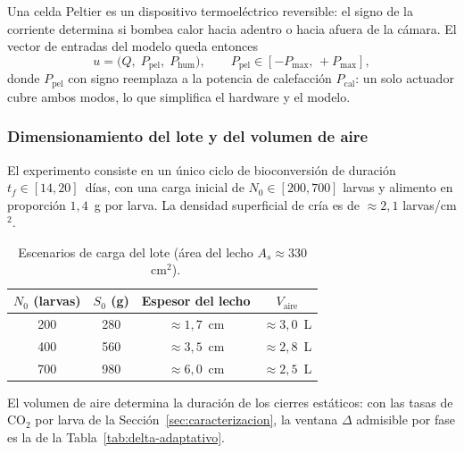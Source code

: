\begin{remark}\label{rem:peltier}
Una celda Peltier es un dispositivo termoeléctrico reversible: el signo de la
corriente determina si bombea calor hacia adentro o hacia afuera de la cámara.
El vector de entradas del modelo queda entonces
\[
  u = \big(Q,\; P_{\mathrm{pel}},\; P_{\mathrm{hum}}\big),
  \qquad
  P_{\mathrm{pel}} \in [-P_{\max},\, +P_{\max}],
\]
donde $P_{\mathrm{pel}}$ con signo reemplaza a la potencia de calefacción
$P_{\mathrm{cal}}$: un solo actuador cubre ambos modos, lo que simplifica el
hardware y el modelo.
\end{remark}


\subsubsection{Dimensionamiento del lote y del volumen de aire}

El experimento consiste en un único ciclo de bioconversión de duración
$t_f \in [14, 20]$~días, con una carga inicial de $N_0 \in [200, 700]$ larvas
y alimento en proporción $1{,}4$~g por larva. La densidad superficial de
cría es de $\approx 2{,}1$ larvas/cm$^2$.

\begin{table}[htbp]
  \centering
  \caption{Escenarios de carga del lote (área del lecho $A_s \approx 330$~cm$^2$).}
  \label{tab:carga-lote}
  \begin{tabular}{cccc}
    \hline
    $N_0$ (larvas) & $S_0$ (g) & Espesor del lecho & $V_{\mathrm{aire}}$ \\
    \hline
    200 & 280  & $\approx 1{,}7$~cm & $\approx 3{,}0$~L \\
    400 & 560  & $\approx 3{,}5$~cm & $\approx 2{,}8$~L \\
    700 & 980  & $\approx 6{,}0$~cm & $\approx 2{,}5$~L \\
    \hline
  \end{tabular}
\end{table}

El volumen de aire determina la duración de los cierres estáticos: con las
tasas de CO$_2$ por larva de la Sección~\ref{sec:caracterizacion}, la ventana
$\Delta$ admisible por fase es la de la Tabla~\ref{tab:delta-adaptativo}.

